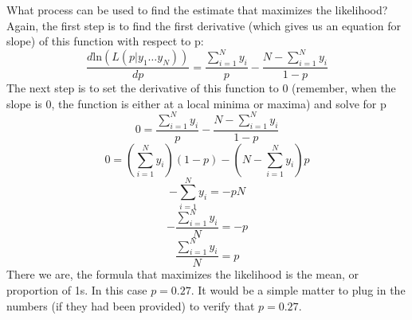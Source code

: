 What process can be used to find the estimate that maximizes the likelihood? Again, the first step is to find the first derivative (which gives us an equation for slope) of this function with respect to p:
\begin{equation}
\frac{d\mbox{ln}\left(L\left(p \vert y_1 \ldots y_N\right)\right)}{dp}=\frac{\sum_{i=1}^Ny_i}{p}-\frac{N-\sum_{i=1}^Ny_i}{1-p}
\end{equation}
The next step is to set the derivative of this function to 0 (remember, when the slope is 0, the function is either at a local minima or maxima) and solve for p
\[
0=\frac{\sum_{i=1}^Ny_i}{p}-\frac{N-\sum_{i=1}^Ny_i}{1-p}
\]
\[
0=\left(\sum_{i=1}^Ny_i\right)\left(1-p\right)-\left(N-\sum_{i=1}^Ny_i\right)p
\]
\[
-\sum_{i=1}^Ny_i=-pN
\]
\[
-\frac{\sum_{i=1}^Ny_i}{N}=-p
\]
\begin{equation}\label{eq:proportion}
\frac{\sum_{i=1}^Ny_i}{N}=p
\end{equation}
There we are, the formula that maximizes the likelihood is the mean, or proportion of 1s. In this case $p = 0.27$. It would be a simple matter to plug in the numbers (if they had been provided) to verify that $p = 0.27$. 